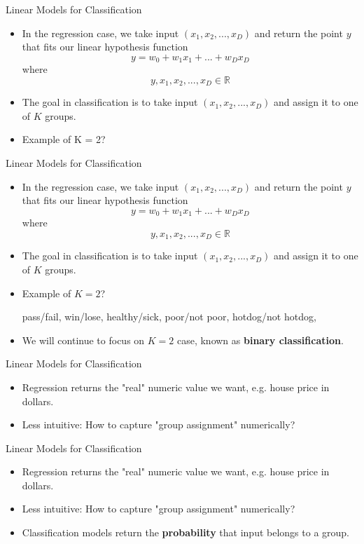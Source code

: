 \begin{frame}{Linear Models for Classification}
\begin{itemize}
    \item In the regression case, we take input $(x_1, x_2, ..., x_D)$ and return the point $y$ that fits our linear hypothesis function $$y = w_0 + w_1x_1 + ... + w_Dx_D$$ where
    $$y, x_1, x_2, ..., x_D \in \mathbb{R}$$
    \item The goal in classification is to take input $(x_1, x_2, ..., x_D)$ and assign it to one of $K$ groups.
    \item Example of K = 2?
\end{itemize}
\end{frame}

\begin{frame}{Linear Models for Classification}
\begin{itemize}
    \item In the regression case, we take input $(x_1, x_2, ..., x_D)$ and return the point $y$ that fits our linear hypothesis function $$y = w_0 + w_1x_1 + ... + w_Dx_D$$ where
    $$y, x_1, x_2, ..., x_D \in \mathbb{R}$$
    \item The goal in classification is to take input $(x_1, x_2, ..., x_D)$ and assign it to one of $K$ groups.
    \item Example of $K = 2$? 
    
    pass/fail, win/lose, healthy/sick, poor/not poor, hotdog/not hotdog,
    \item We will continue to focus on $K = 2$ case, known as \textbf{binary classification}.
\end{itemize}
\end{frame}

\begin{frame}{Linear Models for Classification}
\begin{itemize}
    \item Regression returns the "real" numeric value we want, e.g. house price in dollars.
    \item Less intuitive: How to capture "group assignment" numerically? 
\end{itemize}
\end{frame}

\begin{frame}{Linear Models for Classification}
\begin{itemize}
    \item Regression returns the "real" numeric value we want, e.g. house price in dollars.
    \item Less intuitive: How to capture "group assignment" numerically? 
    \item Classification models return the \textbf{probability} that input belongs to a group.
\end{itemize}
\end{frame}

